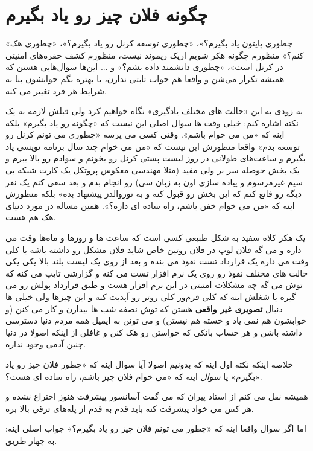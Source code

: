 \section{چگونه فلان چیز رو یاد بگیرم}
«چطوری پایتون یاد بگیرم؟»، «چطوری توسعه کرنل رو یاد بگیرم؟»،‌ «چطوری هک کنم؟» منظورم چگونه هکر شویم
اریک ریموند نیست،‌ منظورم کشف حفره‌های امنیتی در کرنل است»، «چطوری دانشمند داده بشم؟» و ... این‌‌ها سوال‌هایی هستن که همیشه تکرار می‌شن و واقعا هم جواب ثابتی ندارن، یا بهتره بگم جوابشون بنا به شرایط هر فرد تغییر می کنه.

به زودی به این «حالت های مختلف یادگیری» نگاه خواهیم کرد ولی قبلش لازمه به یک نکته اشاره کنم: خیلی وقت ها سوال اصلی این نیست که «چگونه  رو یاد بگیرم»‌ بلکه اینه که «من می خوام  باشم». وقتی کسی می پرسه «چطوری می تونم کرنل رو توسعه بدم» واقعا منظورش این نیست که «من می خوام چند سال برنامه نویسی یاد بگیرم و ساعت‌های طولانی در روز لیست پستی کرنل رو بخونم و سوادم رو بالا ببرم و یک بخش حوصله سر بر ولی مفید (مثلا مهندسی معکوس پروتکل یک کارت شبکه بی سیم غیرمرسوم و پیاده سازی اون به زبان سی) رو انجام بدم و بعد سعی کنم یک نفر دیگه رو قانع کنم که این بخش رو قبول کنه و به توروالدز پیشنهاد بده»‌ بلکه منظورش اینه که «من می خوام خفن باشم، راه ساده ای داره؟». همین مساله در مورد دنیای هک هم هست. 

یک هکر کلاه سفید به شکل طبیعی کسی است که ساعت ها و روزها و ماه‌ها وقت می ذاره و می گه فلان لوپ در فلان روتین خاص شاید فلان مشکل رو داشته باشه یا کلی وقت می ذاره یک قرارداد تست نفوذ می بنده و بعد از روی یک لیست بلند بالا یکی یکی حالت های مختلف نفوذ رو روی یک نرم افزار تست می کنه و گزارشی تایپ می کنه که توش می گه چه مشکلات امنیتی در این نرم افزار هست و طبق قرارداد پولش رو می گیره یا شغلش اینه که کلی فر‌م‌ور کلی روتر رو آپدیت کنه و این چیزها ولی خیلی ها دنبال
\textbf{تصویری غیر واقعی}
هستن که توش نصفه شب ها بیدارن و کار می کنن (و خوابشون هم نمی یاد و خسته هم نیستن) و می تونن به ایمیل همه مردم دنیا دسترسی داشته باشن و هر حساب بانکی که خواستن رو هک کنن و غافلن از اینکه اصولا در دنیا چنین آدمی وجود نداره.

خلاصه اینکه نکته اول اینه که بدونیم اصولا آیا سوال اینه که «چطور فلان چیز رو یاد بگیرم» یا
\emph{سوال}
اینه که «می خوام فلان چیز باشم، راه ساده ای هست؟».

همیشه نقل می کنم از استاد پیران که می گفت آسانسور پیشرفت هنوز اختراع نشده و هر کس می خواد پیشرفت کنه باید قدم به قدم از پله‌های ترقی بالا بره.

اما اگر سوال واقعا اینه که «چطور می تونم فلان چیز رو یاد بگیرم؟» جواب اصلی اینه: به چهار طریق.
